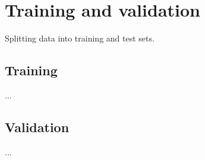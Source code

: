 \section{Training and validation}
Splitting data into training and test sets.
\subsection{Training}
...
\subsection{Validation}
...
